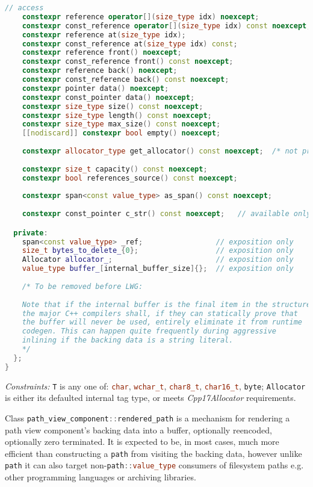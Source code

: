 \documentclass[11pt]{article}
\newcommand{\code}[2][cpp]{\lstinline[language=#1,basicstyle=\small\ttfamily]{#2}}
\newcommand{\desc}[1]{\textit{#1}}
\newcommand{\constraints}{\desc{Constraints: }}
\begin{document}
\begin{lstlisting}[language=cpp]
    // access
    constexpr reference operator[](size_type idx) noexcept;
    constexpr const_reference operator[](size_type idx) const noexcept;
    constexpr reference at(size_type idx);
    constexpr const_reference at(size_type idx) const;
    constexpr reference front() noexcept;
    constexpr const_reference front() const noexcept;
    constexpr reference back() noexcept;
    constexpr const_reference back() const noexcept;
    constexpr pointer data() noexcept;
    constexpr const_pointer data() noexcept;
    constexpr size_type size() const noexcept;
    constexpr size_type length() const noexcept;
    constexpr size_type max_size() const noexcept;
    [[nodiscard]] constexpr bool empty() noexcept;
    
    constexpr allocator_type get_allocator() const noexcept;  /* not present if default_rendered_path_allocator tag type was used */
    
    constexpr size_t capacity() const noexcept;
    constexpr bool references_source() const noexcept;
    
    constexpr span<const value_type> as_span() const noexcept;
    
    constexpr const_pointer c_str() const noexcept;   // available only if zero_terminated and non-byte backing

  private:
    span<const value_type> _ref;                 // exposition only
    size_t bytes_to_delete_{0};                  // exposition only
    Allocator allocator_;                        // exposition only
    value_type buffer_[internal_buffer_size]{};  // exposition only
    
    /* To be removed before LWG:
    
    Note that if the internal buffer is the final item in the structure,
    the major C++ compilers shall, if they can statically prove that
    the buffer will never be used, entirely eliminate it from runtime
    codegen. This can happen quite frequently during aggressive
    inlining if the backing data is a string literal.
    */
  };
}
\end{lstlisting}

\constraints \code{T} is any one of: \code{char}, \code{wchar_t}, \code{char8_t}, \code{char16_t}, \code{byte}; \code{Allocator} is either its defaulted internal tag type, or meets \emph{Cpp17Allocator} requirements.

Class \code{path_view_component::rendered_path} is a mechanism for rendering a path view component's backing data into a buffer, optionally reencoded, optionally zero terminated. It is expected to be, in most cases, much more efficient than constructing a \code{path} from visiting the backing data, however unlike \code{path} it can also target non-\code{path::value_type} consumers of filesystem paths e.g. other programming languages or archiving libraries.
\end{document}
